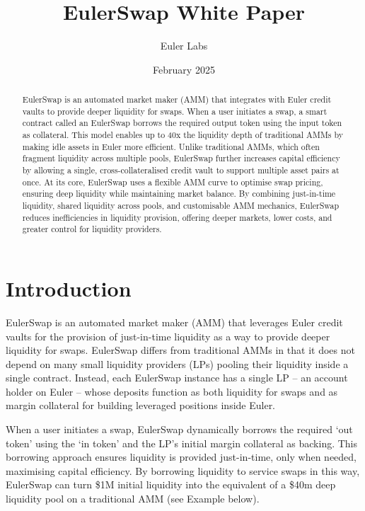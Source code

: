 \documentclass{article}
\title{EulerSwap White Paper}
\author{Euler Labs}
\date{February 2025}
\begin{document}
\maketitle

\begin{abstract}    
EulerSwap is an automated market maker (AMM) that integrates with Euler credit vaults to provide deeper liquidity for swaps. When a user initiates a swap, a smart contract called an EulerSwap borrows the required output token using the input token as collateral. This model enables up to 40x the liquidity depth of traditional AMMs by making idle assets in Euler more efficient. Unlike traditional AMMs, which often fragment liquidity across multiple pools, EulerSwap further increases capital efficiency by allowing a single, cross-collateralised credit vault to support multiple asset pairs at once. At its core, EulerSwap uses a flexible AMM curve to optimise swap pricing, ensuring deep liquidity while maintaining market balance. By combining just-in-time liquidity, shared liquidity across pools, and customisable AMM mechanics, EulerSwap reduces inefficiencies in liquidity provision, offering deeper markets, lower costs, and greater control for liquidity providers.
\end{abstract}

\section{Introduction}

EulerSwap is an automated market maker (AMM) that leverages Euler credit vaults for the provision of just-in-time liquidity as a way to provide deeper liquidity for swaps. EulerSwap differs from traditional AMMs in that it does not depend on many small liquidity providers (LPs) pooling their liquidity inside a single contract. Instead, each EulerSwap instance has a single LP -- an account holder on Euler -- whose deposits function as both liquidity for swaps and as margin collateral for building leveraged positions inside Euler. 

When a user initiates a swap, EulerSwap dynamically borrows the required `out token' using the `in token' and the LP's initial margin collateral as backing. This borrowing approach ensures liquidity is provided just-in-time, only when needed, maximising capital efficiency. By borrowing liquidity to service swaps in this way, EulerSwap can turn \$1M initial liquidity into the equivalent of a \$40m deep liquidity pool on a traditional AMM (see Example below).
\end{document}
